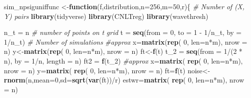\documentclass[12pt,twoside, a4paper]{reedthesis}
\newenvironment{Shaded}{}{}
\newcommand{\CommentTok}[1]{\textcolor[rgb]{0.38,0.63,0.69}{\textit{#1}}}
\newcommand{\ControlFlowTok}[1]{\textcolor[rgb]{0.00,0.44,0.13}{\textbf{#1}}}
\newcommand{\DataTypeTok}[1]{\textcolor[rgb]{0.56,0.13,0.00}{#1}}
\newcommand{\DecValTok}[1]{\textcolor[rgb]{0.25,0.63,0.44}{#1}}
\newcommand{\KeywordTok}[1]{\textcolor[rgb]{0.00,0.44,0.13}{\textbf{#1}}}
\newcommand{\NormalTok}[1]{#1}
\newcommand{\OperatorTok}[1]{\textcolor[rgb]{0.40,0.40,0.40}{#1}}
\newcommand{\StringTok}[1]{\textcolor[rgb]{0.25,0.44,0.63}{#1}}
\begin{document}
\begin{Shaded}
\begin{Highlighting}[]
\NormalTok{sim_npsiguniffunc <-}\ControlFlowTok{function}\NormalTok{(f,distribution,}\DataTypeTok{n=}\DecValTok{256}\NormalTok{,}\DataTypeTok{m=}\DecValTok{50}\NormalTok{,r)\{}
  \CommentTok{# Number of (X, Y) pairs}
  \KeywordTok{library}\NormalTok{(tidyverse)}
  \KeywordTok{library}\NormalTok{(CNLTreg)}
  \KeywordTok{library}\NormalTok{(wavethresh)}
  
\NormalTok{  n_t =}\StringTok{ }\NormalTok{n }\CommentTok{# number of points on t grid}
\NormalTok{  t =}\StringTok{ }\KeywordTok{seq}\NormalTok{(}\DataTypeTok{from =} \DecValTok{0}\NormalTok{, }\DataTypeTok{to =} \DecValTok{1} \OperatorTok{-}\StringTok{ }\DecValTok{1}\OperatorTok{/}\NormalTok{n_t, }\DataTypeTok{by =} \DecValTok{1}\OperatorTok{/}\NormalTok{n_t)}
  \CommentTok{# Number of simulations}
  \CommentTok{#approx}
\NormalTok{  x=}\KeywordTok{matrix}\NormalTok{(}\KeywordTok{rep}\NormalTok{( }\DecValTok{0}\NormalTok{, }\DataTypeTok{len=}\NormalTok{n}\OperatorTok{*}\NormalTok{m), }\DataTypeTok{nrow =}\NormalTok{ n)}
\NormalTok{  y<-}\KeywordTok{matrix}\NormalTok{(}\KeywordTok{rep}\NormalTok{( }\DecValTok{0}\NormalTok{, }\DataTypeTok{len=}\NormalTok{n}\OperatorTok{*}\NormalTok{m), }\DataTypeTok{nrow =}\NormalTok{ n)}
\NormalTok{  ft<-}\KeywordTok{f}\NormalTok{(t)}
\NormalTok{  t_}\DecValTok{2}\NormalTok{ =}\StringTok{ }\KeywordTok{seq}\NormalTok{(}\DataTypeTok{from =} \DecValTok{1}\OperatorTok{/}\NormalTok{(}\DecValTok{2} \OperatorTok{*}\StringTok{ }\NormalTok{n), }\DataTypeTok{by =} \DecValTok{1}\OperatorTok{/}\NormalTok{n, }\DataTypeTok{length =}\NormalTok{ n)}
\NormalTok{  ft2 =}\StringTok{ }\KeywordTok{f}\NormalTok{(t_}\DecValTok{2}\NormalTok{)}
  \CommentTok{#approx}
\NormalTok{  x=}\KeywordTok{matrix}\NormalTok{( }\KeywordTok{rep}\NormalTok{( }\DecValTok{0}\NormalTok{, }\DataTypeTok{len=}\NormalTok{n}\OperatorTok{*}\NormalTok{m), }\DataTypeTok{nrow =}\NormalTok{ n)}
\NormalTok{  y=}\KeywordTok{matrix}\NormalTok{( }\KeywordTok{rep}\NormalTok{( }\DecValTok{0}\NormalTok{, }\DataTypeTok{len=}\NormalTok{n}\OperatorTok{*}\NormalTok{m), }\DataTypeTok{nrow =}\NormalTok{ n)}
\NormalTok{  ft=}\KeywordTok{f}\NormalTok{(t)}
\NormalTok{  noise<-}\KeywordTok{rnorm}\NormalTok{(n,}\DataTypeTok{mean=}\DecValTok{0}\NormalTok{,}\DataTypeTok{sd=}\KeywordTok{sqrt}\NormalTok{(}\KeywordTok{var}\NormalTok{(ft))}\OperatorTok{/}\NormalTok{r)}
\NormalTok{  estwr=}\KeywordTok{matrix}\NormalTok{( }\KeywordTok{rep}\NormalTok{( }\DecValTok{0}\NormalTok{, }\DataTypeTok{len=}\NormalTok{n}\OperatorTok{*}\NormalTok{m), }\DataTypeTok{nrow =}\NormalTok{ n)}

\end{Highlighting}
\end{Shaded}
\end{document}
